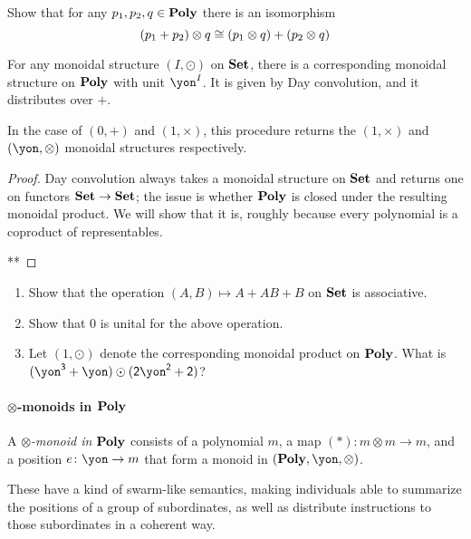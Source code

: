 \documentclass[Book-Poly]{subfiles}
\begin{document}
\begin{exercise}
Show that for any $p_1,p_2,q\in\textbf{Poly}$ there is an isomorphism
\[
(p_1+p_2)\otimes q\cong (p_1\otimes q)+(p_2\otimes q)
\qedhere
\]
\end{exercise}

\begin{proposition}
For any monoidal structure $(I,\odot)$ on $\textbf{Set}$, there is a corresponding monoidal structure on $\textbf{Poly}$ with unit $\yon^I$. It is given by Day convolution, and it distributes over $+$. 

In the case of $(0,+)$ and $(1,\times)$, this procedure returns the $(1,\times)$ and $(\yon,\otimes)$ monoidal structures respectively.
\end{proposition}
\begin{proof}
Day convolution always takes a monoidal structure on $\textbf{Set}$ and returns one on functors $\textbf{Set}\to\textbf{Set}$; the issue is whether $\textbf{Poly}$ is closed under the resulting monoidal product. We will show that it is, roughly because every polynomial is a coproduct of representables.

**
\end{proof}

\begin{exercise}
\begin{enumerate}
	\item Show that the operation $(A, B)\mapsto A+AB+B$ on $\textbf{Set}$ is associative.
	\item Show that $0$ is unital for the above operation.
	\item Let $(1,\odot)$ denote the corresponding monoidal product on $\textbf{Poly}$. What is $(\yon^\3+\yon)\odot(\2\yon^\2+\2)$?
\qedhere
\end{enumerate}
\end{exercise}

\paragraph{$\otimes$-monoids in $\textbf{Poly}$}

\begin{definition}
A \emph{$\otimes$-monoid in $\textbf{Poly}$} consists of a polynomial $m$, a map $(*)\colon m\otimes m\to m$, and a position $e\colon\yon\to m$ that form a monoid in $(\poly,\yon,\otimes)$.
\end{definition}

These have a kind of swarm-like semantics, making individuals able to summarize the positions of a group of subordinates, as well as distribute instructions to those subordinates in a coherent way. 
\end{document}
